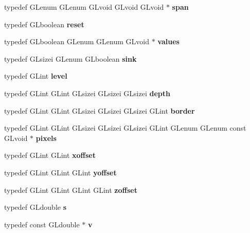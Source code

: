 \begin{DoxyCompactItemize}
\item 
typedef G\+Lenum G\+Lenum G\+Lvoid G\+Lvoid G\+Lvoid $\ast$ {\bfseries span}\label{_s_d_l__opengl_8h_a5c3e64bd109484c4d0b9ba6debe3e8ad}

\item 
typedef G\+Lboolean {\bfseries reset}\label{_s_d_l__opengl_8h_a11158672fb6a3f09183a338ecff59e41}

\item 
typedef G\+Lboolean G\+Lenum G\+Lenum G\+Lvoid $\ast$ {\bfseries values}\label{_s_d_l__opengl_8h_a300a8ed5fb9490aa35713406ec0412df}

\item 
typedef G\+Lsizei G\+Lenum G\+Lboolean {\bfseries sink}\label{_s_d_l__opengl_8h_a98256b3410c68877f51c14b2ad0591ab}

\item 
typedef G\+Lint {\bfseries level}\label{_s_d_l__opengl_8h_a2424d012241ecec8ab2763eddf543736}

\item 
typedef G\+Lint G\+Lint G\+Lsizei G\+Lsizei G\+Lsizei {\bfseries depth}\label{_s_d_l__opengl_8h_a1c814629538debe12a7bfe2509a3671e}

\item 
typedef G\+Lint G\+Lint G\+Lsizei G\+Lsizei G\+Lsizei G\+Lint {\bfseries border}\label{_s_d_l__opengl_8h_a6180492a53d6843c599d9934a5facf65}

\item 
typedef G\+Lint G\+Lint G\+Lsizei G\+Lsizei G\+Lsizei G\+Lint G\+Lenum G\+Lenum const G\+Lvoid $\ast$ {\bfseries pixels}\label{_s_d_l__opengl_8h_a314ae25bb13f298e0aaff5f9637afff8}

\item 
typedef G\+Lint G\+Lint {\bfseries xoffset}\label{_s_d_l__opengl_8h_ac20a0ffebf4c476650fcfa0633066f0e}

\item 
typedef G\+Lint G\+Lint G\+Lint {\bfseries yoffset}\label{_s_d_l__opengl_8h_a76dfb6803dcff61037ba688b7f4242b8}

\item 
typedef G\+Lint G\+Lint G\+Lint G\+Lint {\bfseries zoffset}\label{_s_d_l__opengl_8h_af04d9b91a10a38749f463a013e14c182}

\item 
typedef G\+Ldouble {\bfseries s}\label{_s_d_l__opengl_8h_ad585a1393cfa368fa9dc3d8ebff640d5}

\item 
typedef const G\+Ldouble $\ast$ {\bfseries v}\label{_s_d_l__opengl_8h_adfdba28282fbf886223676912be34ab4}


\end{DoxyCompactItemize}
